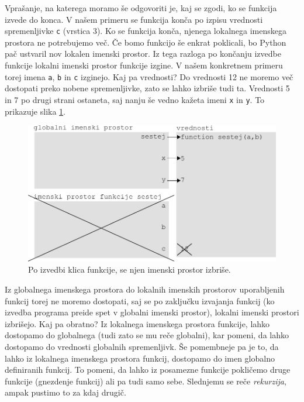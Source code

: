 Vprašanje, na katerega moramo še odgovoriti je, kaj se zgodi, ko se funkcija izvede do konca. V našem primeru se funkcija konča po izpisu vrednosti spremenljivke \texttt{c} (vrstica 3). Ko se funkcija konča, njenega lokalnega imenskega prostora ne potrebujemo več. Če bomo funkcijo še enkrat poklicali, bo Python pač ustvaril nov lokalen imenski prostor. Iz tega razloga po končanju izvedbe funkcije lokalni imenski prostor funkcije izgine. V našem konkretnem primeru torej imena \texttt{a}, \texttt{b} in \texttt{c} izginejo. Kaj pa vrednosti? Do vrednosti 12 ne moremo več dostopati preko nobene spremenljivke, zato se lahko izbriše tudi ta. Vrednosti 5 in 7 po drugi strani ostaneta, saj nanju še vedno kažeta imeni \texttt{x} in \texttt{y}. To prikazuje slika \ref{img:imenski_prostor_6}.
\begin{figure}
    \centering
    \includegraphics[width=\linewidth]{img/imenski_prostor_6.pdf}
    \caption{Po izvedbi klica funkcije, se njen imenski prostor izbriše.}
    \label{img:imenski_prostor_6}
\end{figure}

Iz globalnega imenskega prostora do lokalnih imenskih prostorov uporabljenih funkcij torej ne moremo dostopati, saj se po zaključku izvajanja funkcij (ko izvedba programa preide spet v globalni imenski prostor), lokalni imenski prostori izbrišejo. Kaj pa obratno? Iz lokalnega imenskega prostora funkcije, lahko dostopamo do globalnega (tudi zato se mu reče globalni), kar pomeni, da lahko dostopamo do vrednosti globalnih spremenljivk. Še pomembneje pa je to, da lahko iz lokalnega imenskega prostora funkcij, dostopamo do imen globalno definiranih funkcij. To pomeni, da lahko iz posamezne funkcije pokličemo druge funkcije (gnezdenje funkcij) ali pa tudi samo sebe. Slednjemu se reče \emph{rekurzija}, ampak pustimo to za kdaj drugič. 

